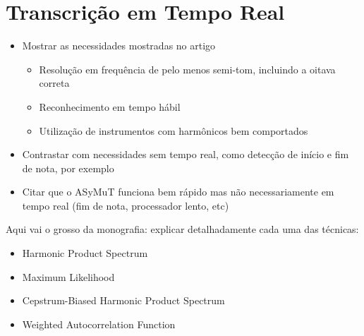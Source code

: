 \chapter{Transcrição em Tempo Real}
\label{cap:temporeal}

\begin{itemize}
\item Mostrar as necessidades mostradas no artigo 
	\begin{itemize}
	\item Resolução em frequência de pelo menos semi-tom, incluindo a oitava correta
	\item Reconhecimento em tempo hábil
	\item Utilização de instrumentos com harmônicos bem comportados
	\end{itemize}
\item Contrastar com necessidades sem tempo real, como detecção de início e fim de nota, por exemplo
\item Citar que o ASyMuT funciona bem rápido mas não necessariamente em tempo real (fim de nota, processador lento, etc)
\end{itemize}

Aqui vai o grosso da monografia: explicar detalhadamente cada uma das técnicas:

\begin{itemize}
\item Harmonic Product Spectrum
\item Maximum Likelihood
\item Cepstrum-Biased Harmonic Product Spectrum
\item Weighted Autocorrelation Function
\end{itemize}